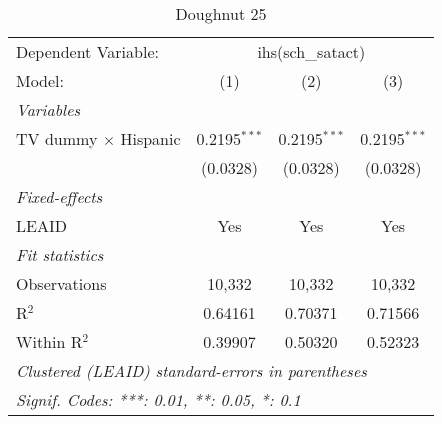 \begin{table}[htbp]
\centering
\caption{Doughnut 25}
\begin{tabular}{lccc}
\tabularnewline\midrule\midrule
Dependent Variable:&\multicolumn{3}{c}{ihs(sch\_satact)}\\
Model:&(1) & (2) & (3)\\
\midrule \emph{Variables}&   &   &  \\
TV dummy $\times$ Hispanic & 0.2195$^{***}$ & 0.2195$^{***}$ & 0.2195$^{***}$\\
  &(0.0328) & (0.0328) & (0.0328)\\
\midrule \emph{Fixed-effects}&   &   &  \\
LEAID & Yes & Yes & Yes\\
\midrule \emph{Fit statistics}&  & & \\
Observations & 10,332&10,332&10,332\\
R$^2$ & 0.64161&0.70371&0.71566\\
Within R$^2$ & 0.39907&0.50320&0.52323\\
\midrule\midrule\multicolumn{4}{l}{\emph{Clustered (LEAID) standard-errors in parentheses}}\\
\multicolumn{4}{l}{\emph{Signif. Codes: ***: 0.01, **: 0.05, *: 0.1}}\\
\end{tabular}
\end{table}

